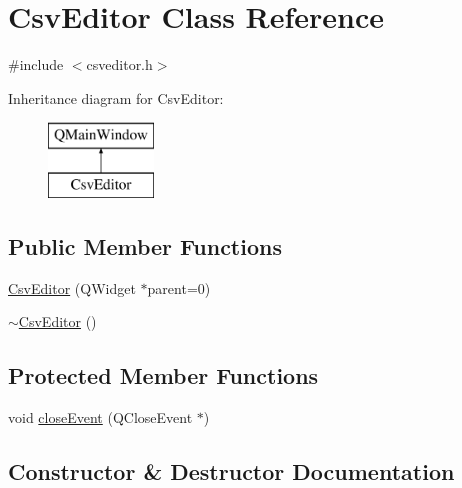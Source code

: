 \hypertarget{class_csv_editor}{}\section{Csv\+Editor Class Reference}
\label{class_csv_editor}


{\ttfamily \#include $<$csveditor.\+h$>$}

Inheritance diagram for Csv\+Editor\+:\begin{figure}[H]
\begin{center}
\leavevmode
\includegraphics[height=2.000000cm]{d3/da0/class_csv_editor}
\end{center}
\end{figure}
\subsection*{Public Member Functions}
\begin{DoxyCompactItemize}
\item 
\mbox{\hyperlink{class_csv_editor_a96dbb6d2286cb140d5928b23227cae1c}{Csv\+Editor}} (Q\+Widget $\ast$parent=0)
\item 
\mbox{\hyperlink{class_csv_editor_abeb132e295a0408b44cbf3438ea0a5e3}{$\sim$\+Csv\+Editor}} ()
\end{DoxyCompactItemize}
\subsection*{Protected Member Functions}
\begin{DoxyCompactItemize}
\item 
void \mbox{\hyperlink{class_csv_editor_a6593a23cad0852bc3a60eb3bd44febc8}{close\+Event}} (Q\+Close\+Event $\ast$)
\end{DoxyCompactItemize}


\subsection{Constructor \& Destructor Documentation}
\mbox{\label{class_csv_editor_a96dbb6d2286cb140d5928b23227cae1c}} 
